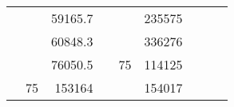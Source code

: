 \begin{table}[H]
\begin{tabular}{|ccrccrccc}
\multicolumn{1}{|c|}{\cellcolor[HTML]{FFFFC7}}                                & \multicolumn{1}{c|}{\cellcolor[HTML]{DAE8FC}}                      & \multicolumn{1}{r|}{\cellcolor[HTML]{DAE8FC}59165.7}   & \multicolumn{1}{c|}{\cellcolor[HTML]{FFFFC7}}                                & \multicolumn{1}{c|}{\cellcolor[HTML]{DAE8FC}}                       & \multicolumn{1}{r|}{\cellcolor[HTML]{DDFDFF}235575}    &                                                                              &                                                                    &                                                        \\ \cline{3-3} \cline{6-6}
\multicolumn{1}{|c|}{\cellcolor[HTML]{FFFFC7}}                                & \multicolumn{1}{c|}{\cellcolor[HTML]{DAE8FC}}                      & \multicolumn{1}{r|}{\cellcolor[HTML]{DDFDFF}60848.3}   & \multicolumn{1}{c|}{\cellcolor[HTML]{FFFFC7}}                                & \multicolumn{1}{c|}{\cellcolor[HTML]{DAE8FC}}                       & \multicolumn{1}{r|}{\cellcolor[HTML]{DAE8FC}336276}    &                                                                              &                                                                    &                                                        \\ \cline{3-3} \cline{6-6}
\multicolumn{1}{|c|}{\cellcolor[HTML]{FFFFC7}}                                & \multicolumn{1}{c|}{\cellcolor[HTML]{DAE8FC}}                      & \multicolumn{1}{r|}{\cellcolor[HTML]{DAE8FC}76050.5}   & \multicolumn{1}{c|}{\cellcolor[HTML]{FFFFC7}}                                & \multicolumn{1}{c|}{\multirow{-10}{*}{\cellcolor[HTML]{DAE8FC}75}}  & \multicolumn{1}{r|}{\cellcolor[HTML]{DDFDFF}114125}    &                                                                              &                                                                    &                                                        \\ \cline{3-3} \cline{5-6}
\multicolumn{1}{|c|}{\cellcolor[HTML]{FFFFC7}}                                & \multicolumn{1}{c|}{\multirow{-10}{*}{\cellcolor[HTML]{DAE8FC}75}} & \multicolumn{1}{r|}{\cellcolor[HTML]{DDFDFF}153164}    & \multicolumn{1}{c|}{\cellcolor[HTML]{FFFFC7}}                                & \multicolumn{1}{c|}{\cellcolor[HTML]{DDFDFF}}                       & \multicolumn{1}{r|}{\cellcolor[HTML]{DAE8FC}154017}    &                                                                              &                                                                    &                                                        \\ \cline{2-3} \cline{6-6}

\end{tabular}
\end{table}
